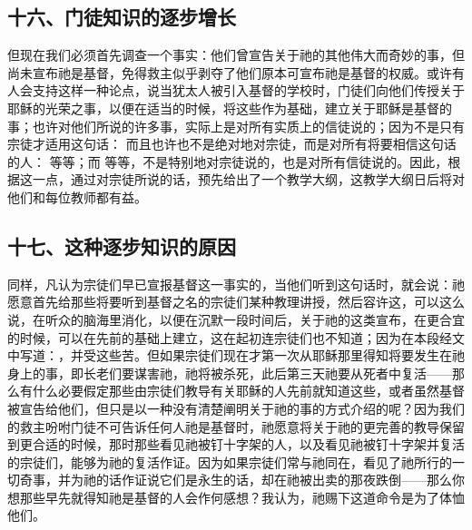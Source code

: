 
\subsection{十六、门徒知识的逐步增长}

但现在我们必须首先调查一个事实：他们曾宣告关于祂的其他伟大而奇妙的事，但尚未宣布祂是基督，免得救主似乎剥夺了他们原本可宣布祂是基督的权威。或许有人会支持这样一种论点，说当犹太人被引入基督的学校时，门徒们向他们传授关于耶稣的光荣之事，以便在适当的时候，将这些作为基础，建立关于耶稣是基督的事；也许对他们所说的许多事，实际上是对所有实质上的信徒说的；因为不是只有宗徒才适用这句话： 而且也许也不是绝对地对宗徒，而是对所有将要相信这句话的人： 等等；而 等等，不是特别地对宗徒说的，也是对所有信徒说的。因此，根据这一点，通过对宗徒所说的话，预先给出了一个教学大纲，这教学大纲日后将对他们和每位教师都有益。\par


\subsection{十七、这种逐步知识的原因}

同样，凡认为宗徒们早已宣报基督这一事实的，当他们听到这句话时，就会说：祂愿意首先给那些将要听到基督之名的宗徒们某种教理讲授，然后容许这，可以这么说，在听众的脑海里消化，以便在沉默一段时间后，关于祂的这类宣布，在更合宜的时候，可以在先前的基础上建立，这在起初连宗徒们也不知道；因为在本段经文中写道：，并受这些苦。但如果宗徒们现在才第一次从耶稣那里得知将要发生在祂身上的事，即长老们要谋害祂，祂将被杀死，此后第三天祂要从死者中复活——那么有什么必要假定那些由宗徒们教导有关耶稣的人先前就知道这些，或者虽然基督被宣告给他们，但只是以一种没有清楚阐明关于祂的事的方式介绍的呢？因为我们的救主吩咐门徒不可告诉任何人祂是基督时，祂愿意将关于祂的更完善的教导保留到更合适的时候，那时那些看见祂被钉十字架的人，以及看见祂被钉十字架并复活的宗徒们，能够为祂的复活作证。因为如果宗徒们常与祂同在，看见了祂所行的一切奇事，并为祂的话作证说它们是永生的话，却在祂被出卖的那夜跌倒——那么你想那些早先就得知祂是基督的人会作何感想？我认为，祂赐下这道命令是为了体恤他们。\par

